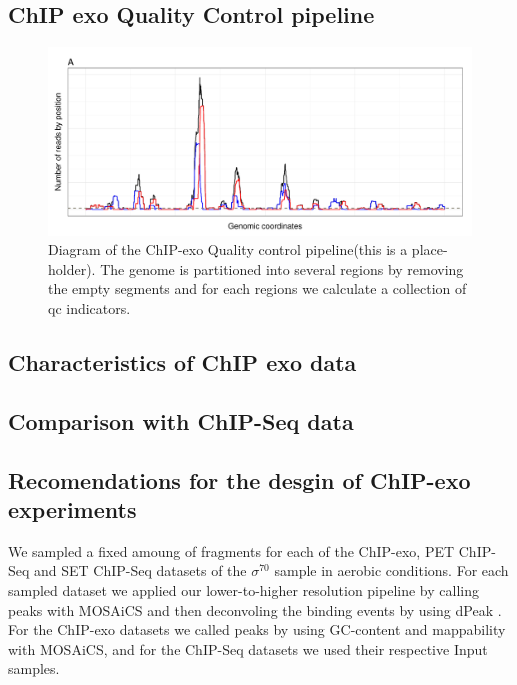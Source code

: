 \documentclass{bmcart}\usepackage[]{graphicx}\usepackage[]{color}
\begin{document}
\subsection{ChIP exo Quality Control pipeline}
\label{sec:QC}

\begin{figure}[h!]
  \centering
  \includegraphics[width = .9\textwidth]{../figs/for_paper/coverage_diagram.pdf}
  \caption{Diagram of the ChIP-exo Quality control pipeline(this is a
    place-holder). The genome is partitioned into several regions by
    removing the empty segments and for each regions we calculate a
    collection of qc indicators.}
  \label{fig:qcdiagram}
\end{figure}

\subsection{Characteristics of ChIP exo data}
\label{sec:charac}





\subsection{Comparison with ChIP-Seq data}
\label{sec:comp}




\subsection{Recomendations for the desgin of ChIP-exo experiments}
\label{sec:reco}



We sampled a fixed amoung of fragments for each of the ChIP-exo, PET
ChIP-Seq and SET ChIP-Seq datasets of the $\sigma^{70}$ sample in
aerobic conditions. For each sampled dataset we applied our
lower-to-higher resolution pipeline by calling peaks with MOSAiCS
\cite{mosaics} and then deconvoling the binding events by using dPeak
\cite{dpeak}. For the ChIP-exo datasets we called peaks by using
GC-content and mappability with MOSAiCS, and for the ChIP-Seq datasets
we used their respective Input samples.
\end{document}
